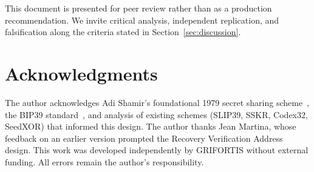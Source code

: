 \documentclass[11pt]{article}
\begin{document}
This document is presented for peer review rather than as a production recommendation. We invite critical analysis, independent replication, and falsification along the criteria stated in Section~\ref{sec:discussion}.

\section*{Acknowledgments}

The author acknowledges Adi Shamir's foundational 1979 secret sharing scheme~\cite{shamir1979}, the BIP39 standard~\cite{bip39}, and analysis of existing schemes (SLIP39, SSKR, Codex32, SeedXOR) that informed this design. The author thanks Jean Martina, whose feedback on an earlier version prompted the Recovery Verification Address design. This work was developed independently by GRIFORTIS without external funding. All errors remain the author's responsibility.
\end{document}
